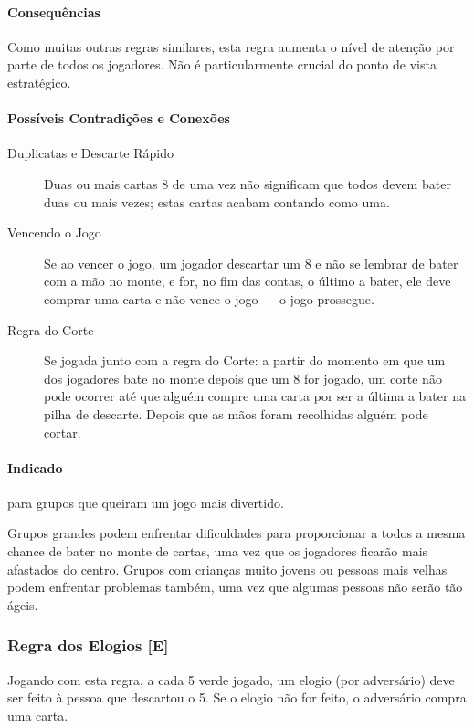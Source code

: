 \paragraph{Consequências}

Como muitas outras regras similares, esta regra aumenta o nível de atenção por parte de todos os jogadores. Não é particularmente crucial do ponto de vista estratégico.

\paragraph{Possíveis Contradições e Conexões}

\begin{description}
\item[Duplicatas e Descarte Rápido]{Duas ou mais cartas 8 de uma vez não significam que todos devem bater duas ou mais vezes; estas cartas acabam contando como uma.}
\item[Vencendo o Jogo]{Se ao vencer o jogo, um jogador descartar um 8 e não se lembrar de bater com a mão no monte, e for, no fim das contas, o último a bater, ele deve comprar uma carta e não vence o jogo --- o jogo prossegue.}
\item[Regra do Corte]{Se jogada junto com a regra do Corte: a partir do momento em que um dos jogadores bate no monte depois que um 8 for jogado, um corte não pode ocorrer até que alguém compre uma carta por ser a última a bater na pilha de descarte. Depois que as mãos foram recolhidas alguém pode cortar.}
\end{description}

\paragraph{Indicado} 

para grupos que queiram um jogo mais divertido.

Grupos grandes podem enfrentar dificuldades para proporcionar a todos a mesma chance de bater no monte de cartas, uma vez que os jogadores ficarão mais afastados do centro. Grupos com crianças muito jovens ou pessoas mais velhas podem enfrentar problemas também, uma vez que algumas pessoas não serão tão ágeis.

\subsubsection{Regra dos Elogios [E]}

Jogando com esta regra, a cada 5 verde jogado, um elogio (por adversário) deve ser feito à pessoa que descartou o 5. Se o elogio não for feito, o adversário compra uma carta.

